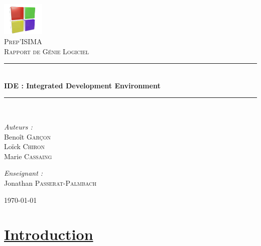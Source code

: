 \documentclass[a4paper, 12pt]{article}
\newcommand{\HRule}{\rule{\linewidth}{0.5mm}}
\begin{document}
\pagecolor{bleuciel}


\begin{titlepage}
\begin{center}
\includegraphics[width=0.15\textwidth]{./images/logo.png}~\\[1cm]

\textsc{\LARGE Prep'ISIMA}\\[1.5cm]

\textsc{\Large Rapport de Génie Logiciel}\\[0.5cm]

\HRule \\[0.4cm]
{ \huge \bfseries IDE : Integrated Development Environment}\\[0.4cm]

\HRule \\[1.5cm]

\begin{minipage}{0.4\textwidth}
\begin{flushleft} \large
\emph{Auteurs :}\\
Benoît \textsc{Garçon}\\
Loïck \textsc{Chiron}\\
Marie \textsc{Cassaing}
\end{flushleft}
\end{minipage}
\begin{minipage}{0.4\textwidth}
\begin{flushright} \large
\emph{Enseignant :} \\
Jonathan \textsc{Passerat-Palmbach}
\end{flushright}
\end{minipage}

\vfill

{\large \today}

\end{center}
\end{titlepage}

\setcounter{page}{1}

\newpage \renewcommand{\contentsname}{Sommaire}  \tableofcontents
\pagecolor{blanc}

\newpage \section*{\underline{Introduction}} 
\end{document}
